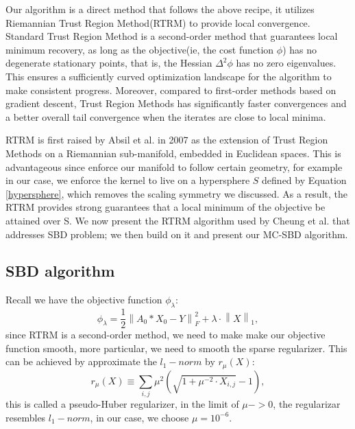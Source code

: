 Our algorithm is a direct method that follows the above recipe, it utilizes Riemannian Trust Region Method(RTRM) to provide local convergence. Standard Trust Region Method is a second-order method that guarantees local minimum recovery, as long as the objective(ie, the cost function $\phi$) has no degenerate stationary points, that is, the Hessian $\Delta^2\phi$ has no zero eigenvalues. This ensures a sufficiently curved optimization landscape for the algorithm to make consistent progress. Moreover, compared to first-order methods based on gradient descent, Trust Region Methods has significantly faster convergences and a better overall tail convergence when the iterates are close to local minima. 

\ac{RTRM} is first raised by Absil et al. in 2007 as the extension of Trust Region Methods on a Riemannian sub-manifold, embedded in Euclidean spaces. This is advantageous since enforce our manifold to follow certain geometry, for example in our case, we enforce the kernel to live on a hypersphere $S$ defined by Equation \ref{hypersphere}, which removes the scaling symmetry we discussed. As a result, the \ac{RTRM} provides strong guarantees that a local minimum of the objective be attained over S. We now present the \ac{RTRM} algorithm used by Cheung et al. \cite{cheungDictionaryLearningFouriertransform2020} that addresses \ac{SBD} problem; we then build on it and present our \ac{MC-SBD} algorithm. 

\subsection{SBD algorithm}
Recall we have the objective function $\phi_{\lambda}$: 
\begin{equation}
	\phi_{\lambda} = \frac{1}{2}\left\lVert A_0 * X_0 - Y \right\rVert^2_F + \lambda \cdot  \left\lVert X\right\rVert_1,
\end{equation}
since \ac{RTRM} is a second-order method, we need to make make our objective function smooth, more particular, we need to smooth the sparse regularizer. This can be achieved by approximate the $l_1-norm$ by $r_{\mu}(X)$:
\begin{equation}
	r_{\mu}(X) \equiv \sum_{i,j} \mu^2(\sqrt{1+\mu^{-2}\cdot X_{i,j}}-1), 
\end{equation}
this is called a pseudo-Huber regularizer, in the limit of $\mu -> 0$, the regularizar resembles $l_1-norm$, in our case, we choose $\mu = 10^{-6}$. 

